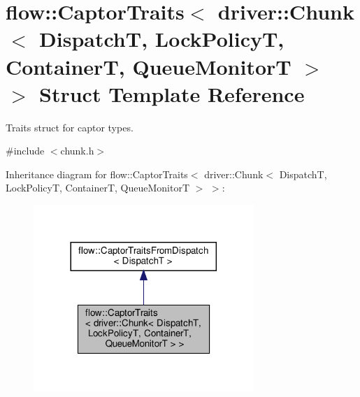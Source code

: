\hypertarget{structflow_1_1_captor_traits_3_01driver_1_1_chunk_3_01_dispatch_t_00_01_lock_policy_t_00_01_contf25136d799b84e6e744301cf371fdfc2}{}\section{flow\+:\+:Captor\+Traits$<$ driver\+:\+:Chunk$<$ DispatchT, Lock\+PolicyT, ContainerT, Queue\+MonitorT $>$ $>$ Struct Template Reference}
\label{structflow_1_1_captor_traits_3_01driver_1_1_chunk_3_01_dispatch_t_00_01_lock_policy_t_00_01_contf25136d799b84e6e744301cf371fdfc2}


Traits struct for captor types.  




{\ttfamily \#include $<$chunk.\+h$>$}



Inheritance diagram for flow\+:\+:Captor\+Traits$<$ driver\+:\+:Chunk$<$ DispatchT, Lock\+PolicyT, ContainerT, Queue\+MonitorT $>$ $>$\+:
\nopagebreak
\begin{figure}[H]
\begin{center}
\leavevmode
\includegraphics[width=236pt]{structflow_1_1_captor_traits_3_01driver_1_1_chunk_3_01_dispatch_t_00_01_lock_policy_t_00_01_contd827df6a40b2e91b19343856540a74d5}
\end{center}
\end{figure}


